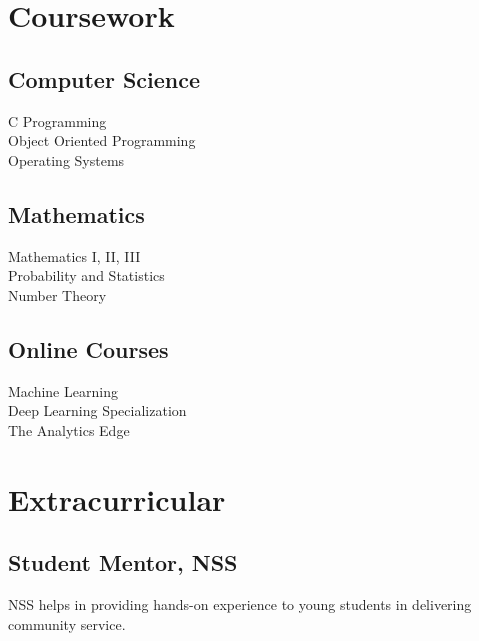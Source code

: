 \documentclass[]{plushcv}
\begin{document}
\begin{minipage}[t]{0.25\textwidth}
	
	
	
	\section{Coursework}
	
	\subsection{Computer Science}
	C Programming \textbullet{}\\ 
	Object Oriented Programming \textbullet{}\\ 
	Operating Systems 
	\sectionsep
	
	\subsection{Mathematics}
	Mathematics I, II, III \textbullet{}\\
	Probability and Statistics \textbullet{}\\
	Number Theory
	\sectionsep
	 
	\subsection{Online Courses}
	Machine Learning \textbullet{}\\ 
	Deep Learning Specialization \textbullet{}\\ 
	The Analytics Edge 
	\sectionsep
	
	 
	\section{Extracurricular}
	\subsection{Student Mentor, NSS}
	NSS helps in providing hands-on experience to young students in delivering community service.
	 
	
	
\end{minipage} 
\end{document}
